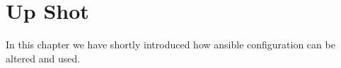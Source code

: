 \documentclass[10pt]{book}
\begin{document}
\section{Up Shot}
In this chapter we have shortly introduced how ansible configuration can be 
altered and used.


 
 

\printindex

\clearemptydoublepage
\end{document}
